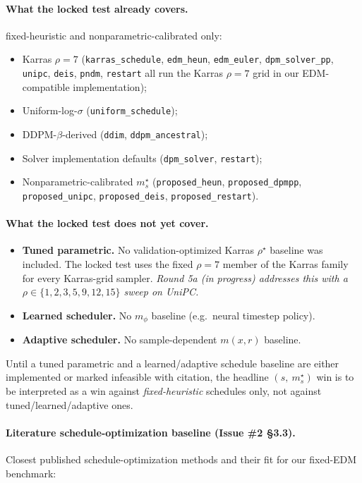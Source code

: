 \documentclass[11pt]{article}
\begin{document}
\paragraph{What the locked test already covers.} fixed-heuristic and
nonparametric-calibrated only:
\begin{itemize}
\item Karras \(\rho{=}7\) (\texttt{karras\_schedule}, \texttt{edm\_heun}, \texttt{edm\_euler}, \texttt{dpm\_solver\_pp}, \texttt{unipc}, \texttt{deis}, \texttt{pndm}, \texttt{restart} all run the Karras \(\rho{=}7\) grid in our EDM-compatible implementation);
\item Uniform-log-\(\sigma\) (\texttt{uniform\_schedule});
\item DDPM-\(\beta\)-derived (\texttt{ddim}, \texttt{ddpm\_ancestral});
\item Solver implementation defaults (\texttt{dpm\_solver}, \texttt{restart});
\item Nonparametric-calibrated \(m_s^\star\) (\texttt{proposed\_heun}, \texttt{proposed\_dpmpp}, \texttt{proposed\_unipc}, \texttt{proposed\_deis}, \texttt{proposed\_restart}).
\end{itemize}

\paragraph{What the locked test does not yet cover.}
\begin{itemize}
\item \textbf{Tuned parametric.} No validation-optimized Karras \(\rho^\star\) baseline was included. The locked test uses the fixed \(\rho{=}7\) member of the Karras family for every Karras-grid sampler. \emph{Round 5a (in progress) addresses this with a \(\rho \in \{1,2,3,5,9,12,15\}\) sweep on UniPC.}
\item \textbf{Learned scheduler.} No \(m_\phi\) baseline (e.g.\ neural timestep policy).
\item \textbf{Adaptive scheduler.} No sample-dependent \(m(x,r)\) baseline.
\end{itemize}

Until a tuned parametric and a learned/adaptive schedule baseline are
either implemented or marked infeasible with citation, the headline
\((s,\ m_s^\star)\) win is to be interpreted as a win against
\emph{fixed-heuristic} schedules only, not against tuned/learned/adaptive
ones.

\paragraph{Literature schedule-optimization baseline (Issue \#2 \S3.3).}
Closest published schedule-optimization methods and their fit for our
fixed-EDM benchmark:
\end{document}
